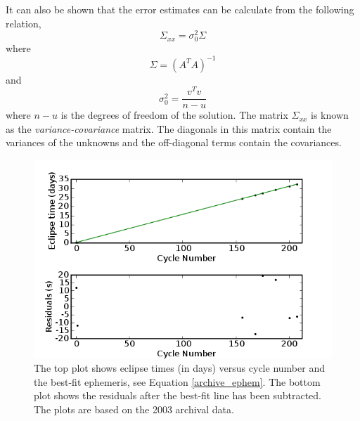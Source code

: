 It can also be shown that the error estimates can be calculate from the following relation, $$ \Sigma_{xx} = \sigma^{2}_{0} \Sigma $$ where $$ \Sigma = (A^{T}A)^{-1} $$ and $$ \sigma^{2}_{0} = \frac{v^{T}v}{n-u} $$ where $n-u$ is the degrees of freedom of the solution. The matrix $ \Sigma_{xx} $ is known as the \textit{variance-covariance} matrix. The diagonals in this matrix contain the variances of the unknowns and the off-diagonal terms contain the covariances.


\begin{figure}
\begin{center}
\includegraphics[width=0.80\columnwidth,bb=0 0 600 400]{images/ephemplot.png}
\caption[Plot of Eclipse times versus cycle number of archival data]{The top plot shows eclipse times (in days) versus cycle number and the best-fit ephemeris, see Equation \ref{archive_ephem}. The bottom plot shows the residuals after the best-fit line has been subtracted.  The plots are based on the 2003 archival data.}
\label{ephemeris}
\end{center}
\end{figure}


